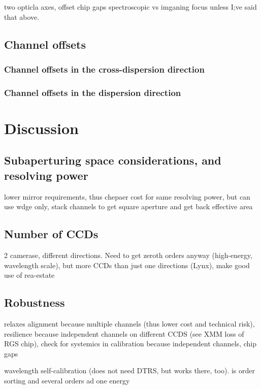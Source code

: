 \documentclass[linenumbers]{aastex631}
\begin{document}
{{two opticla axes,
offset chip gaps
spectroscopic vs imganing focus unless I;ve said that above.


\subsection{Channel offsets}

\subsubsection{Channel offsets in the cross-dispersion direction}

\subsubsection{Channel offsets in the dispersion direction}



\section{Discussion}

\subsection{Subaperturing space considerations, and resolving power}
lower mirror requirements, thus chepaer cost for same resolving power, but can use wdge only, stack channels to get square aperture and get back effective area

\subsection{Number of CCDs}
2 camerase, different directions. Need to get zeroth orders anyway (high-energy, wavelength scale), but more CCDs than just one directions (Lynx), make good use of rea-estate

\subsection{Robustness}
relaxes alignment because multiple channels (thus lower cost and technical risk), resilience because independent channels on different CCDS (see XMM loss of RGS chip), check for systemics in calibration because independent channels, chip gaps

wavelength self-calibration (does not need DTRS, but works there, too). is order sorting and several orders ad one energy

}}
\end{document}
